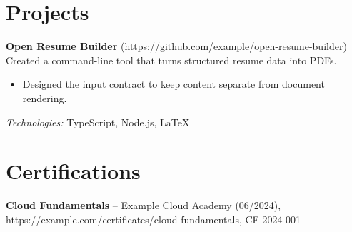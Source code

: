\documentclass[11pt]{article}
\begin{document}
\section*{Projects}
\textbf{ Open Resume Builder } (https://github.com/example/open-resume-builder)\\
Created a command-line tool that turns structured resume data into PDFs.\\
\begin{itemize}
  \item Designed the input contract to keep content separate from document rendering.
\end{itemize}
\emph{Technologies:} TypeScript, Node.js, LaTeX
\section*{Certifications}
\textbf{ Cloud Fundamentals } -- Example Cloud Academy (06/2024), https://example.com/certificates/cloud-fundamentals, CF-2024-001\\
\end{document}
